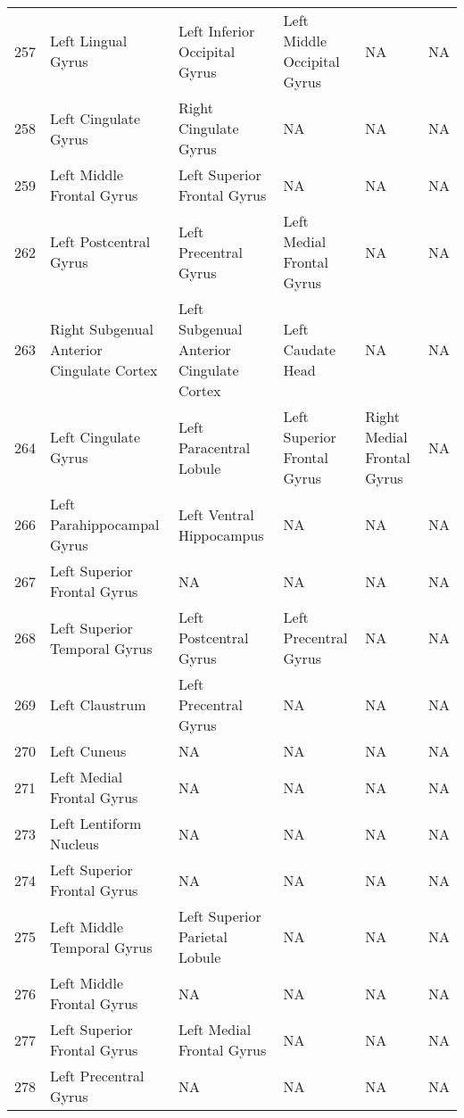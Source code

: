 \documentclass[10pt,letterpaper]{article}\usepackage[]{graphicx}\usepackage[]{color}
\begin{document}
\begin{center}
\begin{longtable}[c]{cP{1.1in}P{1.1in}P{1.1in}P{1.1in}P{1.1in}}
		257	& Left Lingual Gyrus & Left Inferior Occipital Gyrus & Left Middle Occipital Gyrus & NA	& NA \\
		258	& Left Cingulate Gyrus & Right Cingulate Gyrus & NA	& NA & NA \\
		259	& Left Middle Frontal Gyrus & Left Superior Frontal Gyrus & NA & NA	& NA \\
		262	& Left Postcentral Gyrus & Left Precentral Gyrus & Left Medial Frontal Gyrus & NA & NA \\
		263	& Right Subgenual Anterior Cingulate Cortex	& Left Subgenual Anterior Cingulate Cortex & Left Caudate Head & NA & NA \\
		264	& Left Cingulate Gyrus & Left Paracentral Lobule & Left Superior Frontal Gyrus & Right Medial Frontal Gyrus & NA \\
		266	& Left Parahippocampal Gyrus & Left Ventral Hippocampus	& NA & NA & NA \\
		267	& Left Superior Frontal Gyrus & NA & NA	& NA & NA \\
		268	& Left Superior Temporal Gyrus & Left Postcentral Gyrus	& Left Precentral Gyrus	& NA & NA \\
		269	& Left Claustrum & Left Precentral Gyrus & NA & NA & NA \\
		270	& Left Cuneus & NA & NA	& NA & NA \\
		271	& Left Medial Frontal Gyrus	& NA & NA & NA & NA \\
		273	& Left Lentiform Nucleus & NA & NA & NA	& NA \\
		274	& Left Superior Frontal Gyrus & NA & NA	& NA & NA \\
		275	& Left Middle Temporal Gyrus & Left Superior Parietal Lobule & NA & NA & NA \\
		276	& Left Middle Frontal Gyrus	& NA & NA & NA & NA \\
		277	& Left Superior Frontal Gyrus & Left Medial Frontal Gyrus & NA & NA	& NA \\
		278	& Left Precentral Gyrus	& NA & NA & NA & NA \\
	\end{longtable}
\end{center}
\end{document}
